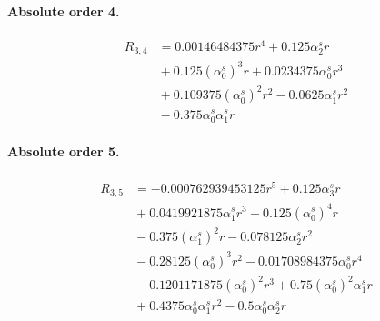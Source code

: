 \documentclass[10pt]{article}
\begin{document}
\paragraph{Absolute order 4.}
\begin{align*}
R_{3,4} &= 0.00146484375 r^{4} + 0.125 \alpha_{2}^s r \\
&{}  + 0.125 \left(\alpha_{0}^s\right)^{3} r + 0.0234375 \alpha_{0}^s r^{3} \\
&{}  + 0.109375 \left(\alpha_{0}^s\right)^{2} r^{2} - 0.0625 \alpha_{1}^s r^{2} \\
&{}  - 0.375 \alpha_{0}^s \alpha_{1}^s r
\end{align*}

\paragraph{Absolute order 5.}
\begin{align*}
R_{3,5} &=  - 0.000762939453125 r^{5} + 0.125 \alpha_{3}^s r \\
&{}  + 0.0419921875 \alpha_{1}^s r^{3} - 0.125 \left(\alpha_{0}^s\right)^{4} r \\
&{}  - 0.375 \left(\alpha_{1}^s\right)^{2} r - 0.078125 \alpha_{2}^s r^{2} \\
&{}  - 0.28125 \left(\alpha_{0}^s\right)^{3} r^{2} - 0.01708984375 \alpha_{0}^s r^{4} \\
&{}  - 0.1201171875 \left(\alpha_{0}^s\right)^{2} r^{3} + 0.75 \left(\alpha_{0}^s\right)^{2} \alpha_{1}^s r \\
&{}  + 0.4375 \alpha_{0}^s \alpha_{1}^s r^{2} - 0.5 \alpha_{0}^s \alpha_{2}^s r
\end{align*}
\end{document}
